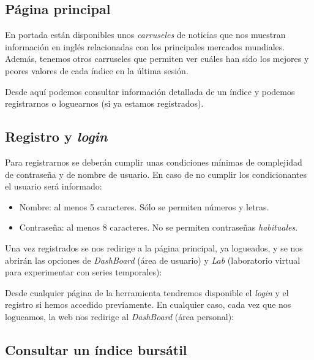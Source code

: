 \subsection{Página principal}


En portada están disponibles unos \emph{carruseles} de noticias que nos muestran información en inglés relacionadas con los principales mercados mundiales. Además, tenemos otros carruseles que permiten ver cuáles han sido los mejores y peores valores de cada índice en la última sesión. 

Desde aquí podemos consultar información detallada de un índice y podemos registrarnos o loguearnos (si ya estamos registrados).

\subsection{Registro y \emph{login}}

Para registrarnos se deberán cumplir unas condiciones mínimas de complejidad de contraseña y de nombre de usuario. En caso de no cumplir los condicionantes el usuario será informado:

\begin{itemize}
\tightlist
\item
Nombre: al menos 5 caracteres. Sólo se permiten números y letras.
\item
Contraseña: al menos 8 caracteres. No se permiten contraseñas \emph{habituales}. 
\end{itemize}

Una vez registrados se nos redirige a la página principal, ya logueados, y se nos abrirán las opciones de \emph{DashBoard} (área de usuario) y \emph{Lab} (laboratorio virtual para experimentar con series temporales):


\newpage

Desde cualquier página de la herramienta tendremos disponible el \emph{login} y el registro si hemos accedido previamente. En cualquier caso, cada vez que nos logueamos, la web nos redirige al \emph{DashBoard} (área personal):


\subsection{Consultar un índice bursátil}

